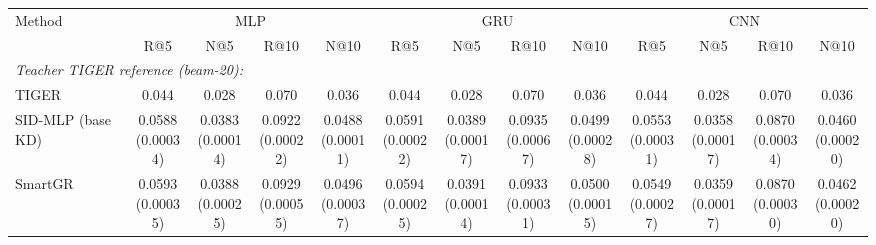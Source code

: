 \begin{table}[t]
\centering
\fontsize{6.6}{7.8}\selectfont
\setlength{\tabcolsep}{1.1mm}
\renewcommand{\arraystretch}{1.05}
\begin{tabular}{lcccccccccccc}
\toprule
Method & \multicolumn{4}{c}{MLP} & \multicolumn{4}{c}{GRU} & \multicolumn{4}{c}{CNN} \\
 & R@5 & N@5 & R@10 & N@10 & R@5 & N@5 & R@10 & N@10 & R@5 & N@5 & R@10 & N@10 \\
\cmidrule(lr){2-5}\cmidrule(lr){6-9}\cmidrule(lr){10-13}
\midrule
\multicolumn{13}{l}{\emph{Teacher TIGER reference (beam-20):}} \\
TIGER & 0.044 & 0.028 & 0.070 & 0.036 & 0.044 & 0.028 & 0.070 & 0.036 & 0.044 & 0.028 & 0.070 & 0.036 \\
\midrule
SID-MLP (base KD) & \shortstack[c]{0.0588\\[-1pt]{\tiny(0.00034)}} & \shortstack[c]{0.0383\\[-1pt]{\tiny(0.00014)}} & \shortstack[c]{0.0922\\[-1pt]{\tiny(0.00022)}} & \shortstack[c]{0.0488\\[-1pt]{\tiny(0.00011)}} & \shortstack[c]{0.0591\\[-1pt]{\tiny(0.00022)}} & \shortstack[c]{0.0389\\[-1pt]{\tiny(0.00017)}} & \shortstack[c]{0.0935\\[-1pt]{\tiny(0.00067)}} & \shortstack[c]{0.0499\\[-1pt]{\tiny(0.00028)}} & \shortstack[c]{0.0553\\[-1pt]{\tiny(0.00031)}} & \shortstack[c]{0.0358\\[-1pt]{\tiny(0.00017)}} & \shortstack[c]{0.0870\\[-1pt]{\tiny(0.00034)}} & \shortstack[c]{0.0460\\[-1pt]{\tiny(0.00020)}} \\
SmartGR & \shortstack[c]{0.0593\\[-1pt]{\tiny(0.00035)}} & \shortstack[c]{0.0388\\[-1pt]{\tiny(0.00025)}} & \shortstack[c]{0.0929\\[-1pt]{\tiny(0.00055)}} & \shortstack[c]{0.0496\\[-1pt]{\tiny(0.00037)}} & \shortstack[c]{0.0594\\[-1pt]{\tiny(0.00025)}} & \shortstack[c]{0.0391\\[-1pt]{\tiny(0.00014)}} & \shortstack[c]{0.0933\\[-1pt]{\tiny(0.00031)}} & \shortstack[c]{0.0500\\[-1pt]{\tiny(0.00015)}} & \shortstack[c]{0.0549\\[-1pt]{\tiny(0.00027)}} & \shortstack[c]{0.0359\\[-1pt]{\tiny(0.00017)}} & \shortstack[c]{0.0870\\[-1pt]{\tiny(0.00030)}} & \shortstack[c]{0.0462\\[-1pt]{\tiny(0.00020)}} \\

\end{tabular}
\end{table}

